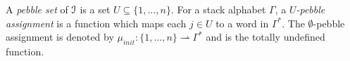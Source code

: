\documentclass[a4paper,UKenglish,cleveref, autoref, thm-restate]{lipics-v2021}
\begin{document}
\fi



A {\em pebble set} of $\mathcal{I}$ is a set $U \subseteq \{ 1, \ldots, n\}$. For a stack alphabet $\Gamma$, a 
{\em $U \!$-pebble assignment} is a function which maps each $j \in U$ to a word in $ \Gamma^*$.
The $\emptyset$-pebble assignment is denoted by $\mu_{init} :  \{ 1, \ldots, n\} \rightharpoonup  \Gamma^* $ and is the 
totally undefined function.

\end{document}
